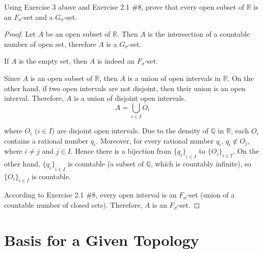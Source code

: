 \begin{exercise}
	Using Exercise 3 above and Exercise 2.1 \#8, prove that every open subset of $\mathbb{R}$ is an $F_{\sigma}$-set and a $G_{\sigma}$-set.
\end{exercise}

\begin{proof}
	Let $A$ be an open subset of $\mathbb{R}$. Then $A$ is the intersection of a countable number of open set, therefore $A$ is a $G_{\sigma}$-set.

	If $A$ is the empty set, then $A$ is indeed an $F_{\sigma}$-set.

	Since $A$ is an open subset of $\mathbb{R}$, then $A$ is a union of open intervals in $\mathbb{R}$. On the other hand, if two open intervals are not disjoint, then their union is an open interval. Therefore, $A$ is a union of disjoint open intervals.
	\[
		A = \bigcup_{i\in I} O_{i}
	\]

	where $O_{i}$ ($i\in I$) are disjoint open intervals. Due to the density of $\mathbb{Q}$ in $\mathbb{R}$, each $O_{i}$ contains a rational number $q_{i}$. Moreover, for every rational number $q_{i}$, $q_{i}\notin O_{j}$, where $i\ne j$ and $j\in I$. Hence there is a bijection from ${\{ q_{i} \}}_{i\in I}$ to ${\{ O_{i} \}}_{i\in I}$. On the other hand, ${\{ q_{i} \}}_{i\in I}$ is countable (a subset of $\mathbb{Q}$, which is countably infinite), so ${\{ O_{i} \}}_{i\in I}$ is countable.

	According to Exercise 2.1 \#8, every open interval is an $F_{\sigma}$-set (union of a countable number of closed sets). Therefore, $A$ is an $F_{\sigma}$-set.
\end{proof}
\newpage

\section{Basis for a Given Topology}
